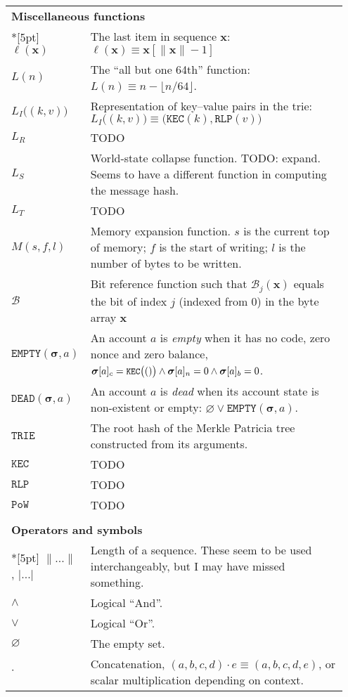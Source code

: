 \documentclass[9pt,oneside]{amsart}
\begin{document}
\begin{longtable}{p{0.10\linewidth}p{0.85\linewidth}}
\vspace{5pt} \\
\midrule
\multicolumn{2}{l}{\textbf{Miscellaneous functions}} \\*[5pt]
$\ell(\mathbf{x})$ & The last item in sequence $\mathbf{x}$: $\ell(\mathbf{x}) \equiv \mathbf{x}[\lVert \mathbf{x} \rVert - 1]$ \\
$L(n)$ & The ``all but one 64th'' function: $L(n) \equiv n - \lfloor n / 64 \rfloor$.\\
$L_I\big( (k, v) \big)$ & Representation of key--value pairs in the trie: $L_I\big( (k, v) \big) \equiv \big(\texttt{KEC}(k), \texttt{RLP}(v)\big)$ \\
$L_R$ & TODO \\
$L_S$ & World-state collapse function. TODO: expand. Seems to have a different function in computing the message hash.\\
$L_T$ & TODO \\
$M(s, f, l)$ & Memory expansion function. $s$ is the current top of memory; $f$ is the start of writing; $l$ is the number of bytes to be written. \\
$\mathcal{B}$ & Bit reference function such that $\mathcal{B}_j(\mathbf{x})$ equals the bit of index $j$ (indexed from 0) in the byte array $\mathbf{x}$ \\
$\mathtt{EMPTY}(\boldsymbol{\sigma}, a)$ & An account $a$ is \textit{empty} when it has no code, zero nonce and zero balance, $\boldsymbol{\sigma}[a]_c = \texttt{\small KEC}\big(()\big) \wedge \boldsymbol{\sigma}[a]_n = 0 \wedge \boldsymbol{\sigma}[a]_b = 0$. \\
$\mathtt{DEAD}(\boldsymbol{\sigma}, a)$ & An account $a$ is \textit{dead} when its account state is non-existent or empty: $\varnothing \vee \mathtt{EMPTY}(\boldsymbol{\sigma}, a)$. \\
$\mathtt{TRIE}$ & The root hash of the Merkle Patricia tree constructed from its arguments. \\
$\mathtt{KEC}$ & TODO \\
$\mathtt{RLP}$ & TODO \\
$\mathtt{PoW}$ & TODO \\

\vspace{5pt} \\
\midrule
\multicolumn{2}{l}{\textbf{Operators and symbols}} \\*[5pt]
$\lVert ... \rVert$, $| ... |$ & Length of a sequence. These seem to be used interchangeably, but I may have missed something. \\
$\wedge$ & Logical ``And''. \\
$\vee$ & Logical ``Or''. \\
$\varnothing$ & The empty set. \\
$\cdot$ & Concatenation, $(a, b, c, d) \cdot e \equiv (a, b, c, d, e)$, or scalar multiplication depending on context. \\


\end{longtable}
\end{document}
